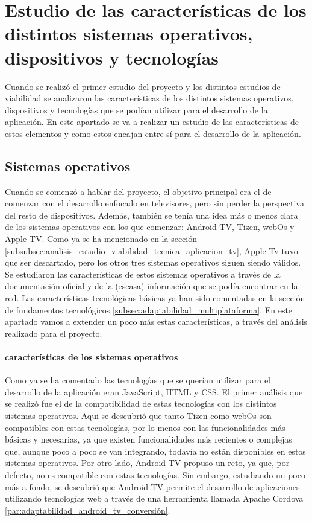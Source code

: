\section{Estudio de las características de los distintos sistemas operativos, dispositivos y tecnologías}
\label{sec:analisis_estudio}

Cuando se realizó el primer estudio del proyecto y los distintos estudios de viabilidad se analizaron las 
características de los distintos sistemas operativos, dispositivos y tecnologías que se podían utilizar para
el desarrollo de la aplicación. En este apartado se va a realizar un estudio de las características de estos 
elementos y como estos encajan entre sí para el desarrollo de la aplicación.

\subsection{Sistemas operativos}
\label{subsec:analisis_estudio_sistemas_operativos}

Cuando se comenzó a hablar del proyecto, el objetivo principal era el de comenzar con el desarrollo enfocado
en televisores, pero sin perder la perspectiva del resto de dispositivos. Además, también se tenía una idea
más o menos clara de los sistemas operativos con los que comenzar: Android TV, Tizen, webOs y Apple TV. Como ya 
se ha mencionado en la sección \ref{subsubsec:analisis_estudio_viabilidad_tecnica_aplicacion_tv}, Apple Tv tuvo
que ser descartado, pero los otros tres sistemas operativos siguen siendo válidos. Se estudiaron las características
de estos sistemas operativos a través de la documentación oficial y de la (escasa) información que se podía encontrar
en la red. Las características tecnológicas básicas ya han sido comentadas en la sección de fundamentos tecnológicos
\ref{subsec:adaptabilidad_multiplataforma}. En este apartado vamos a extender un poco más estas características, a 
través del análisis realizado para el proyecto.

\paragraph{características de los sistemas operativos}
\label{par:analisis_estudio_sistemas_operativos_caracteristicas}
Como ya se ha comentado las tecnologías que se querían utilizar para el desarrollo de la aplicación eran JavaScript,
HTML y CSS. El primer análisis que se realizó fue el de la compatibilidad de estas tecnologías con los distintos
sistemas operativos. Aqui se descubrió que tanto Tizen como webOs son compatibles con estas tecnologías, por lo 
menos con las funcionalidades más básicas y necesarias, ya que existen funcionalidades más recientes o complejas
que, aunque poco a poco se van integrando, todavía no están disponibles en estos sistemas operativos. Por otro lado,
Android TV propuso un reto, ya que, por defecto, no es compatible con estas tecnologías. Sin embargo, estudiando un 
poco más a fondo, se descubrió que Android TV permite el desarrollo de aplicaciones utilizando tecnologías web a través
de una herramienta llamada Apache Cordova \ref{par:adaptabilidad_android_tv_conversión}.

